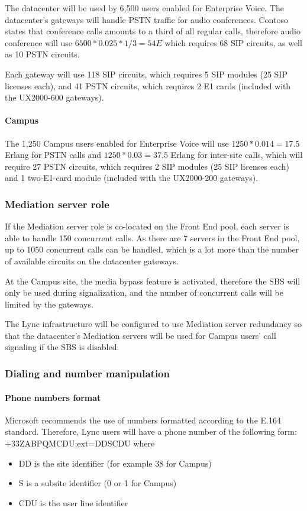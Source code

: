 	The datacenter will be used by 6,500 users enabled for Enterprise Voice. The datacenter's gateways will handle PSTN traffic for audio conferences. Contoso states that conference calls amounts to a third of all regular calls, therefore audio conference will use $6500 * 0.025 * 1/3 = 54 E$ which requires 68 SIP circuits, as well as 10 PSTN circuits.
	
	Each gateway will use 118 SIP circuits, which requires 5 SIP modules (25 SIP licenses each), and 41 PSTN circuits, which requires 2 E1 cards (included with the UX2000-600 gateways).
	
	\paragraph{Campus}
	The 1,250 Campus users enabled for Enterprise Voice will use $1250 * 0.014 = 17.5$ Erlang for PSTN calls and $1250 * 0.03 = 37.5$ Erlang for inter-site calls, which will require 27 PSTN circuits, which requires 2 SIP modules (25 SIP licenses each) and 1 two-E1-card module (included with the UX2000-200 gateways).
	

\subsubsection{Mediation server role}
If the Mediation server role is co-located on the Front End pool, each server is able to handle 150 concurrent calls. As there are 7 servers in the Front End pool, up to 1050 concurrent calls can be handled, which is a lot more than the number of available circuits on the datacenter gateways.

At the Campus site, the media bypass feature is activated, therefore the SBS will only be used during signalization, and the number of concurrent calls will be limited by the gateways.

The Lync infrastructure will be configured to use Mediation server redundancy so that the datacenter's Mediation servers will be used for Campus users' call signaling if the SBS is disabled.

\subsubsection{Dialing and number manipulation}
	\paragraph{Phone numbers format}
	Microsoft recommends the use of numbers formatted according to the E.164 standard. Therefore, Lync users will have a phone number of the following form: +33ZABPQMCDU;ext=DDSCDU where
	\begin{itemize}
		\item DD is the site identifier (for example 38 for Campus)
		\item S is a subsite identifier (0 or 1 for Campus)
		\item CDU is the user line identifier
	\end{itemize}
	
